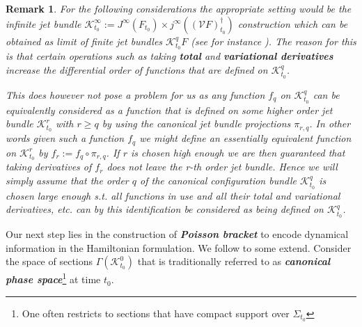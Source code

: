 \documentclass[a4paper,12pt, DIV=14, BCOR=5mm, twoside, headsepline]{scrbook}
\newtheorem*{remark}{Remark}
\begin{document}
\begin{remark}
For the following considerations the appropriate setting would be the infinite jet bundle $\mathcal{K}^{\infty}_{t_0} := J^{\infty}(F_{t_0})\times j^{\infty}((\mathcal{V}F)_{t_0}^{\dagger})$ construction which can be obtained as limit of finite jet bundles $\mathcal{K}^q_{t_0}F$ (see for instance \cite{saunders_1989}). The reason for this is that certain operations such as taking \textit{\textbf{total}} and \textit{\textbf{variational derivatives}} increase the differential order of functions that are defined on $\mathcal{K}^{q}_{t_0}$.

This does however not pose a problem for us as any function $f_q$ on $\mathcal{K}^q_{t_0}$ can be equivalently considered as a function that is defined on some higher order jet bundle $\mathcal{K}^r_{t_0}$ with $r\geq q$ by using the canonical jet bundle projections $\pi_{r,q}$. In other words given such a function $f_q$ we might define an essentially equivalent function on $\mathcal{K}^r_{t_0}$ by $f_r:=f_q \circ \pi_{r,q}$. If $r$ is chosen high enough we are then guaranteed that taking derivatives of $f_r$ does not leave the r-th order jet bundle. Hence we will simply assume that the order $q$ of the canonical configuration bundle $\mathcal{K}^q_{t_0}$ is chosen large enough s.t. all functions in use and all their total and variational derivatives, etc. can by this identification be considered as being defined on $\mathcal{K}^q_{t_0}$.  
\end{remark}

Our  next step lies in the construction of \textit{\textbf{Poisson bracket}} to encode dynamical information in the Hamiltonian formulation. 
We follow \cite{1997hep.th....9164B} to some extend. Consider the space of sections  $\Gamma(\mathcal{K}^0_{t_0})$ that is traditionally referred to as \textit{\textbf{canonical phase space}}\footnote{One often restricts to sections that have compact support over $\Sigma_{t_0}$} at time $t_0$. 
\end{document}
